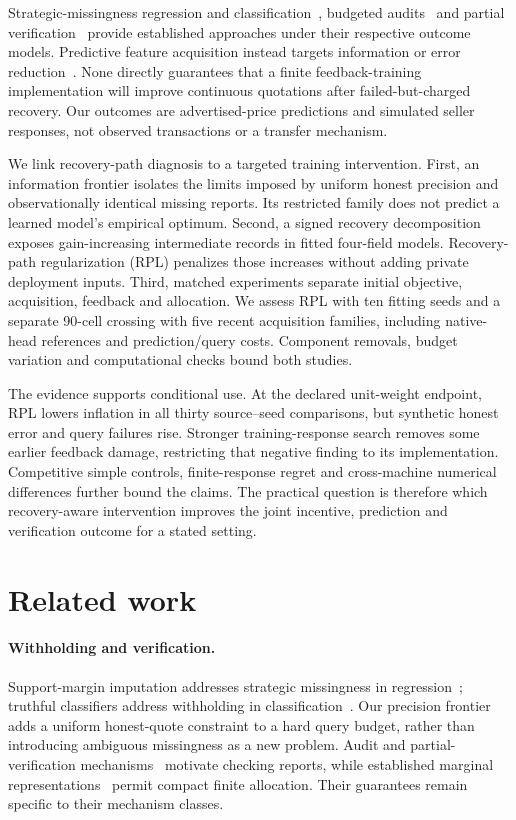 \documentclass[11pt]{article}
\begin{document}
Strategic-missingness regression and classification~\cite{smi,withheld},
budgeted audits~\cite{audits} and partial verification~\cite{partial} provide
established approaches under their respective outcome models. Predictive
feature acquisition instead targets information or error reduction~\cite{activeoracle}.
None directly guarantees that a finite feedback-training implementation will
improve continuous quotations after failed-but-charged recovery. Our outcomes
are advertised-price predictions and simulated seller responses, not observed
transactions or a transfer mechanism.

We link recovery-path diagnosis to a targeted training intervention.
First, an information frontier isolates the limits imposed by uniform honest
precision and observationally identical missing reports. Its restricted family
does not predict a learned model's empirical optimum. Second, a signed
recovery decomposition exposes gain-increasing intermediate records in fitted
four-field models. Recovery-path regularization (RPL) penalizes those increases
without adding private deployment inputs. Third, matched experiments separate
initial objective, acquisition, feedback and allocation. We assess RPL with
ten fitting seeds and a separate 90-cell crossing with five recent acquisition
families, including native-head references and prediction/query costs.
Component removals, budget variation and computational checks bound both studies.

The evidence supports conditional use. At the declared unit-weight endpoint,
RPL lowers inflation in all thirty source--seed comparisons, but synthetic
honest error and query failures rise. Stronger training-response search removes
some earlier feedback damage, restricting that negative finding to its
implementation. Competitive simple controls, finite-response regret and
cross-machine numerical differences further bound the claims. The practical
question is therefore which recovery-aware intervention improves the joint
incentive, prediction and verification outcome for a stated setting.

\section{Related work}\label{sec:related}
\paragraph{Withholding and verification.}
Support-margin imputation addresses strategic missingness in regression~\cite{smi};
truthful classifiers address withholding in classification~\cite{withheld}.
Our precision frontier adds a uniform honest-quote constraint to a hard query
budget, rather than introducing ambiguous missingness as a new problem.
Audit and partial-verification mechanisms~\cite{audits,partial} motivate
checking reports, while established marginal representations~\cite{marginals}
permit compact finite allocation. Their guarantees remain specific to their
mechanism classes.
\end{document}
